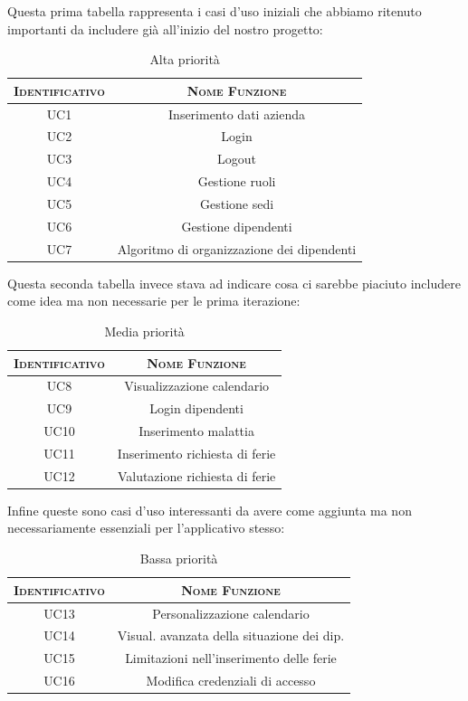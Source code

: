 \documentclass{article}
\begin{document}
Questa prima tabella rappresenta i casi d'uso iniziali che abbiamo ritenuto importanti da includere già all'inizio del nostro progetto:
\def\arraystretch{1.5}%
\begin{table}[H]
\centering
\begin{tabular}[t]{cc}
\toprule
\textsc{Identificativo} & \textsc{Nome Funzione}\\\midrule
UC1 & Inserimento dati azienda \\
UC2 & Login \\
UC3 & Logout \\
UC4 & Gestione ruoli \\
UC5 & Gestione sedi \\
UC6 & Gestione dipendenti \\
UC7 & Algoritmo di organizzazione dei dipendenti\\\bottomrule
\end{tabular}
\caption{\label{tab:high-priority}Alta priorità}
\end{table}
Questa seconda tabella invece stava ad indicare cosa ci sarebbe piaciuto includere come idea ma non necessarie per le prima iterazione:
\begin{table}[H]
\centering
\begin{tabular}[t]{cc}
\toprule
\textsc{Identificativo} & \textsc{Nome Funzione}\\\midrule
UC8 & Visualizzazione calendario \\
UC9 & Login dipendenti \\
UC10 & Inserimento malattia \\
UC11 & Inserimento richiesta di ferie \\
UC12 & Valutazione richiesta di ferie \\\bottomrule
\end{tabular}
\caption{\label{tab:med-priority}Media priorità}
\end{table}
Infine queste sono casi d'uso interessanti da avere come aggiunta ma non necessariamente essenziali per l'applicativo stesso:
\begin{table}[H]
\centering
\begin{tabular}[t]{cc}
\toprule
\textsc{Identificativo} & \textsc{Nome Funzione}\\\midrule
UC13 & Personalizzazione calendario\\
UC14 & Visual. avanzata della situazione dei dip. \\
UC15 & Limitazioni nell'inserimento delle ferie\\
UC16 & Modifica credenziali di accesso \\\bottomrule
\end{tabular}
\caption{\label{tab:low-priority}Bassa priorità}
\end{table}
\end{document}
